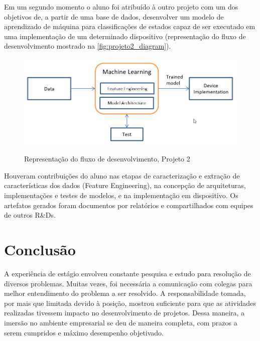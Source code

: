 \documentclass[
	12pt,				%
    oneside,			%
	a4paper,			%
	english,			%
	french,				%
	spanish,			%
	brazil				%
	]{abntex2}
\begin{document}
Em um segundo momento o aluno foi atribuído à outro projeto com um dos objetivos de, a partir de uma base de dados, desenvolver um modelo de aprendizado de máquina para classificações de estados capaz de ser executado em uma implementação de um determinado dispositivo (representação do fluxo de desenvolvimento mostrado na \autoref{fig:projeto2_diagram}).  

\begin{figure}[H] 
  \centering
  \includegraphics[width=400pt]{images/projeto2_diagram.png}\\
  \caption[Representação do fluxo de desenvolvimento, Projeto 2]{Representação do fluxo de desenvolvimento, Projeto 2}  \label{fig:projeto2_diagram}
\end{figure}

Houveram contribuições do aluno nas etapas de caracterização e extração de características dos dados (Feature Engineering), na concepção de arquiteturas, implementações e testes de modelos, e na implementação em dispositivo. Os artefatos gerados foram documentos por relatórios e compartilhados com equipes de outros R\&Ds.

\chapter{Conclusão}

A experiência de estágio envolveu constante pesquisa e estudo para resolução de diversos problemas. Muitas vezes, foi necessária a comunicação com colegas para melhor entendimento do problema a ser resolvido. A responsabilidade tomada, por mais que limitada devido à posição, mostrou suficiente para que as atividades realizadas tivessem impacto no desenvolvimento de projetos. Dessa maneira, a imersão no ambiente empresarial se deu de maneira completa, com prazos a serem cumpridos e máximo desempenho objetivado.
\end{document}
